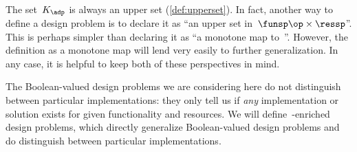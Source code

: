 \begin{remark}\label{rem:feasible-set-is-upper}
  The set~$K_\adp$ is always an upper set (\cref{def:upperset}).
  In fact, another way to define a design problem is to declare it as ``an upper set in~$\funsp\op \times \ressp$''. This is perhaps simpler than declaring it as ``a monotone map to~\Bool''. However, the definition as a monotone map will lend very easily to further generalization. In any case, it is helpful to keep both of these perspectives in mind. 
\end{remark}



The Boolean-valued design problems we are considering here do not distinguish between particular implementations:
they only tell us if \emph{any} implementation or solution exists for given functionality and resources.
We will define~\Set-enriched design problems, which directly generalize Boolean-valued design problems and do distinguish between particular implementations.


